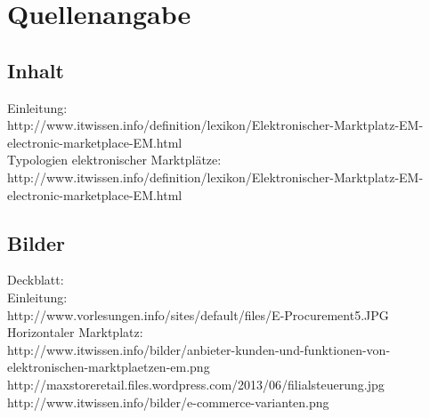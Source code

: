 \documentclass[11pt,a4paper]{article}
\begin{document}
\section{Quellenangabe}
\subsection{Inhalt}
Einleitung: \\
http://www.itwissen.info/definition/lexikon/Elektronischer-Marktplatz-EM-electronic-marketplace-EM.html \\
Typologien elektronischer Marktplätze: \\
http://www.itwissen.info/definition/lexikon/Elektronischer-Marktplatz-EM-electronic-marketplace-EM.html \\
\subsection{Bilder}
Deckblatt: \\
Einleitung: \\ http://www.vorlesungen.info/sites/default/files/E-Procurement5.JPG \\
Horizontaler Marktplatz: \\
http://www.itwissen.info/bilder/anbieter-kunden-und-funktionen-von-elektronischen-marktplaetzen-em.png
\\ 
http://maxstoreretail.files.wordpress.com/2013/06/filialsteuerung.jpg \\
http://www.itwissen.info/bilder/e-commerce-varianten.png \\
\end{document}
